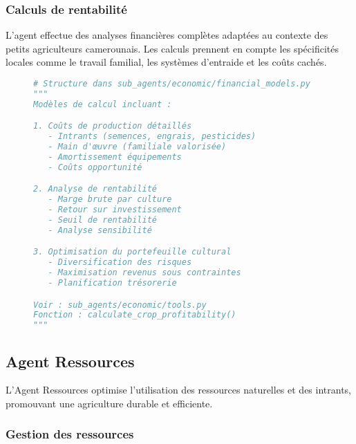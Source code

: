 \subsubsection{Calculs de rentabilité}

L'agent effectue des analyses financières complètes adaptées au contexte des petits agriculteurs camerounais. Les calculs prennent en compte les spécificités locales comme le travail familial, les systèmes d'entraide et les coûts cachés.

\begin{figure}[h]
\centering
\begin{lstlisting}[language=Python, caption=Modèle de calcul économique (aperçu)]
# Structure dans sub_agents/economic/financial_models.py
"""
Modèles de calcul incluant :

1. Coûts de production détaillés
   - Intrants (semences, engrais, pesticides)
   - Main d'œuvre (familiale valorisée)
   - Amortissement équipements
   - Coûts opportunité

2. Analyse de rentabilité
   - Marge brute par culture
   - Retour sur investissement
   - Seuil de rentabilité
   - Analyse sensibilité

3. Optimisation du portefeuille cultural
   - Diversification des risques
   - Maximisation revenus sous contraintes
   - Planification trésorerie

Voir : sub_agents/economic/tools.py
Fonction : calculate_crop_profitability()
"""
\end{lstlisting}
\end{figure}

\subsection{Agent Ressources}

L'Agent Ressources optimise l'utilisation des ressources naturelles et des intrants, promouvant une agriculture durable et efficiente.

\subsubsection{Gestion des ressources}

